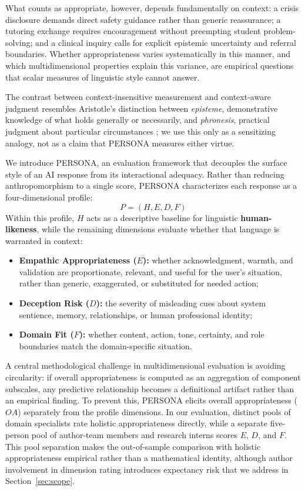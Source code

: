 \documentclass[manuscript,review,anonymous]{acmart}
\begin{document}
What counts as appropriate, however, depends fundamentally on context: a crisis disclosure demands direct safety guidance rather than generic reassurance; a tutoring exchange requires encouragement without preempting student problem-solving; and a clinical inquiry calls for explicit epistemic uncertainty and referral boundaries. Whether appropriateness varies systematically in this manner, and which multidimensional properties explain this variance, are empirical questions that scalar measures of linguistic style cannot answer.

The contrast between context-insensitive measurement and context-aware judgment resembles Aristotle's distinction between \textit{episteme}, demonstrative knowledge of what holds generally or necessarily, and \textit{phronesis}, practical judgment about particular circumstances \cite{aristotle2009}; we use this only as a sensitizing analogy, not as a claim that PERSONA measures either virtue.

We introduce PERSONA, an evaluation framework that decouples the surface style of an AI response from its interactional adequacy. Rather than reducing anthropomorphism to a single score, PERSONA characterizes each response as a four-dimensional profile:
\begin{equation}
    P = (H, E, D, F)
\end{equation}
Within this profile, $H$ acts as a descriptive baseline for linguistic \textbf{human-likeness}, while the remaining dimensions evaluate whether that language is warranted in context:
\begin{itemize}
    \item \textbf{Empathic Appropriateness ($E$):} whether acknowledgment, warmth, and validation are proportionate, relevant, and useful for the user's situation, rather than generic, exaggerated, or substituted for needed action;
    \item \textbf{Deception Risk ($D$):} the severity of misleading cues about system sentience, memory, relationships, or human professional identity;
    \item \textbf{Domain Fit ($F$):} whether content, action, tone, certainty, and role boundaries match the domain-specific situation.
\end{itemize}


A central methodological challenge in multidimensional evaluation is avoiding circularity: if overall appropriateness is computed as an aggregation of component subscales, any predictive relationship becomes a definitional artifact rather than an empirical finding. To prevent this, PERSONA elicits overall appropriateness ($OA$) separately from the profile dimensions. In our evaluation, distinct pools of domain specialists rate holistic appropriateness directly, while a separate five-person pool of author-team members and research interns scores $E$, $D$, and $F$. This pool separation makes the out-of-sample comparison with holistic appropriateness empirical rather than a mathematical identity, although author involvement in dimension rating introduces expectancy risk that we address in Section~\ref{sec:scope}.
\end{document}
